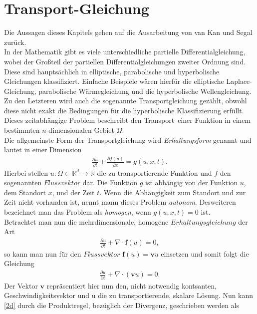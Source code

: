 \documentclass[12pt,titlepage]{article}
\begin{document}
\section{Transport-Gleichung}\label{sec:transglei}
Die Aussagen dieses Kapitels gehen auf die Ausarbeitung von van Kan und Segal \cite{segal2013numerik} zurück.\\
In der Mathematik gibt es viele unterschiedliche partielle Differentialgleichung, wobei der Großteil der partiellen Differentialgleichungen zweiter Ordnung sind. Diese sind hauptsächlich in elliptische, parabolische und hyperbolische Gleichungen klassifiziert. Einfache Beispiele wären hierfür die elliptische Laplace-Gleichung, parabolische Wärmegleichung und die hyperbolische Wellengleichung. Zu den Letzteren wird auch die sogenannte Transportgleichung gezählt, obwohl diese nicht exakt die Bedingungen für die hyperbolische Klassifizierung erfüllt. Dieses zeitabhängige Problem beschreibt den \grqq Transport\grqq~einer Funktion in einem bestimmten $n$-dimensionalen Gebiet $\Omega$.\\
Die allgemeinste Form der Transportgleichung wird \textit{Erhaltungsform} genannt und lautet in einer Dimension
\begin{align}
 \frac{\partial u}{\partial t}+\frac{\partial f(u)}{\partial x}=g(u,x,t).\nonumber
\end{align}
Hierbei stellen $u:\Omega\subset\mathbb{R}^d\to\mathbb{R}$ die zu transportierende Funktion und $f$ den sogenannten $Flussvektor$ dar. Die Funktion $g$ ist abhängig von der Funktion $u$, dem Standort $x$, und der Zeit $t$. Wenn die Abhängigkeit zum Standort und zur Zeit nicht vorhanden ist, nennt mann dieses Problem \textit{autonom}. Desweiteren bezeichnet man das Problem als \textit{homogen}, wenn $g(u,x,t)=0$ ist.\\
Betrachtet man nun die mehrdimensionale, homogene $Erhaltungsgleichung$ der Art
\begin{align}
 \frac{\partial u}{\partial t}+\nabla\cdot\textbf{f}(u)=0,\nonumber
\end{align}
so kann man nun für den $Flussvektor$ $\textbf{f}(u)=\textbf{v} u$ einsetzen und somit folgt die Gleichung
\begin{align}
 \frac{\partial u}{\partial t}+\nabla \cdot (\textbf{v}u)=0.\label{2d}
\end{align}
Der Vektor $\textbf{v}$ repräsentiert hier nun den, nicht notwendig kontsanten, Geschwindigkeitsvektor und u die zu transportierende, skalare Lösung. Nun kann \eqref{2d} durch die Produktregel, bezüglich der Divergenz, geschrieben werden als
\end{document}
